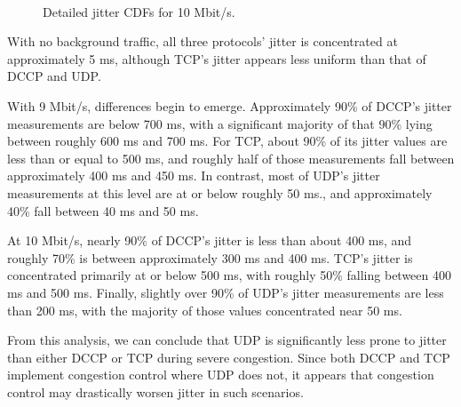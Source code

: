 \begin{figure}[!t]
   \centering
  \\ 
   \caption{Detailed jitter CDFs for 10 Mbit/s.}
\label{fig:jitter_detail_10}
\end{figure}

With no background traffic, all three protocols' jitter is concentrated at
approximately 5 ms, although TCP's jitter appears less uniform than that of DCCP
and UDP.

With 9 Mbit/s, differences begin to emerge. Approximately 90\% of DCCP's jitter
measurements are below 700 ms, with a significant majority of that 90\% lying
between roughly 600 ms and 700 ms. For TCP, about 90\% of its jitter values are
less than or equal to 500 ms, and roughly half of those measurements fall
between approximately 400 ms and 450 ms. In contrast, most of UDP's jitter
measurements at this level are at or below roughly 50 ms., and approximately
40\% fall between 40 ms and 50 ms.

At 10 Mbit/s, nearly 90\% of DCCP's jitter is less than about 400 ms, and
roughly 70\% is between approximately 300 ms and 400 ms. TCP's jitter is
concentrated primarily at or below 500 ms, with roughly 50\% falling between 400
ms and 500 ms. Finally, slightly over 90\% of UDP's jitter measurements are less
than 200 ms, with the majority of those values concentrated near 50 ms.

From this analysis, we can conclude that UDP is significantly less prone to
jitter than either DCCP or TCP during severe congestion. Since both DCCP and TCP
implement congestion control where UDP does not, it appears that congestion
control may drastically worsen jitter in such scenarios.


